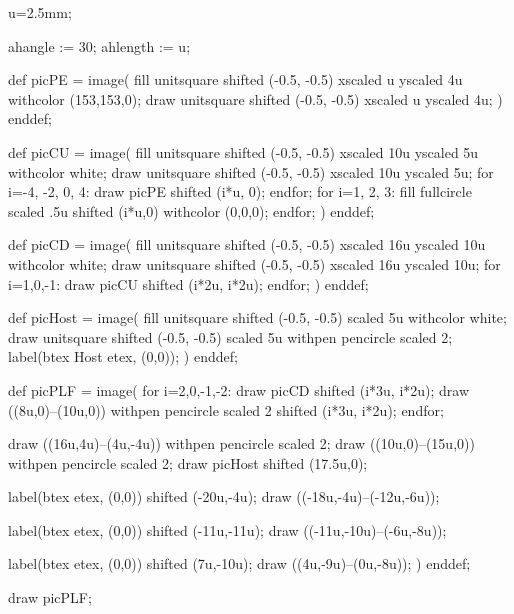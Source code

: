 \startMPinclusions
u=2.5mm;

ahangle := 30;
ahlength := u;
\stopMPinclusions

def picPE =
image(
fill unitsquare shifted (-0.5, -0.5) xscaled u yscaled 4u withcolor (153,153,0);
draw unitsquare shifted (-0.5, -0.5) xscaled u yscaled 4u;
)
enddef;

def picCU =
image(
fill unitsquare shifted (-0.5, -0.5) xscaled 10u yscaled 5u withcolor white;
draw unitsquare shifted (-0.5, -0.5) xscaled 10u yscaled 5u;
for i=-4, -2, 0, 4:
	draw picPE shifted (i*u, 0);
endfor;
for i=1, 2, 3:
	fill fullcircle scaled .5u shifted (i*u,0) withcolor (0,0,0);
endfor;
)
enddef;

def picCD =
image(
fill unitsquare shifted (-0.5, -0.5) xscaled 16u yscaled 10u withcolor white;
draw unitsquare shifted (-0.5, -0.5) xscaled 16u yscaled 10u;
for i=1,0,-1:
	draw picCU shifted (i*2u, i*2u);
endfor;
)
enddef;

def picHost =
image(
fill unitsquare shifted (-0.5, -0.5) scaled 5u withcolor white;
draw unitsquare shifted (-0.5, -0.5) scaled 5u withpen pencircle scaled 2;
label(btex Host etex, (0,0));
)
enddef;

def picPLF =
image(
for i=2,0,-1,-2:
	draw picCD shifted (i*3u, i*2u);
	draw ((8u,0)--(10u,0)) withpen pencircle scaled 2 shifted (i*3u, i*2u);
endfor;

draw ((16u,4u)--(4u,-4u)) withpen pencircle scaled 2;
draw ((10u,0)--(15u,0)) withpen pencircle scaled 2;
draw picHost shifted (17.5u,0);

label(btex  etex, (0,0)) shifted (-20u,-4u);
draw ((-18u,-4u)--(-12u,-6u));

label(btex  etex, (0,0)) shifted (-11u,-11u);
draw ((-11u,-10u)--(-6u,-8u));

label(btex  etex, (0,0)) shifted (7u,-10u);
draw ((4u,-9u)--(0u,-8u));
)
enddef;

draw picPLF;

\stopreusableMPgraphic

